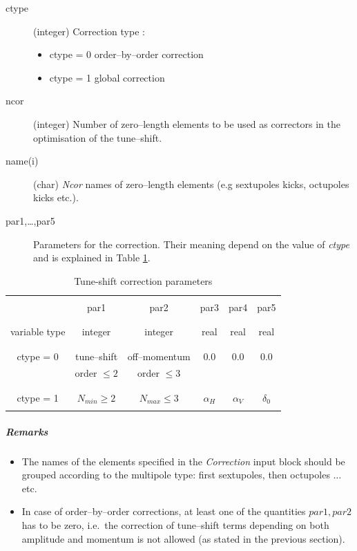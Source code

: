 \begin{description}
\item [ctype] (integer) Correction type :
\begin{itemize}
\item ctype = 0 order--by--order correction
\item ctype = 1 global correction
\end{itemize}
\item [ncor] (integer) Number of zero--length elements to be used as
  correctors in the optimisation of the tune--shift.
\item [name(i)] (char) {\em Ncor} \/names of zero--length elements
  (e.g sextupoles kicks, octupoles kicks etc.).
\item [par1,\ldots,par5] Parameters for the correction. Their meaning
  depend on the value of {\em ctype} \/and is explained in Table \ref{tab:CORR}.
\end{description}
\begin{table}
\begin{center}
\caption{Tune-shift correction parameters}
\label{tab:CORR}
\begin{tabular}{|c|c|c|c|c|c|}
  \hline
  & & & & & \\
  & par1 & par2 & par3 & par4 & par5 \\
  & & & & & \\
  \hline
  & & & & & \\
  variable type & integer & integer & real & real & real \\
  & & & & & \\
  \hline
  & & & & & \\
  ctype = 0 & tune--shift & off--momentum & 0.0 & 0.0 & 0.0 \\
  & order $\leq 2 $& order $\leq 3 $& & & \\
  & & & & & \\
  \hline
  & & & & & \\
  ctype = 1 & $N_{min}\geq 2$ & $N_{max}\leq 3$ & $\alpha_H$ &
  $\alpha_V$ &
  $\delta_0 $ \\
  & & & & & \\
  \hline
\end{tabular}
\end{center}
\end{table}
\subparagraph{Remarks}
\begin{itemize}
\item The names of the elements specified in the {\em Correction }
  \/input block should be grouped according to the multipole type:
  first sextupoles, then octupoles $\ldots$ etc.\ 
\item In case of order--by--order corrections, at least one of the
  quantities $par1,par2$ has to be zero, i.e.\ the correction of
  tune--shift terms depending on both amplitude and momentum is not
  allowed (as stated in the previous section).
\end{itemize}

